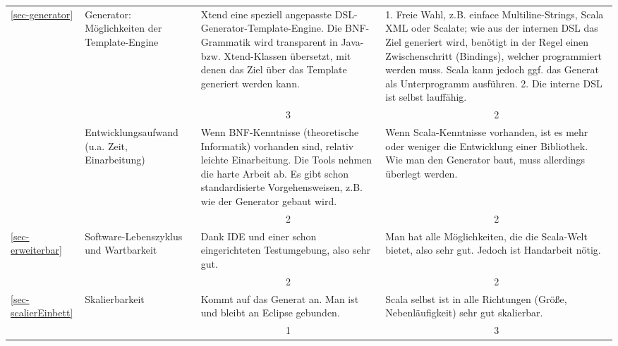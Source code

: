 \begin{landscape}
\begin{longtable}{|p{0.8cm}|p{4.4cm}|p{6.4cm}|p{6.4cm}|}
  \ref{sec-generator}
  & Generator: Möglichkeiten der Template-Engine
  & Xtend eine speziell angepasste DSL-Generator-Template-Engine.
    Die BNF-Grammatik wird transparent in Java- bzw. Xtend-Klassen übersetzt,
    mit denen das Ziel über das Template generiert werden kann.
  & 1. Freie Wahl, z.B. einface Multiline-Strings, Scala XML oder Scalate;
    wie aus der internen DSL das Ziel generiert wird, benötigt in der Regel
    einen Zwischenschritt (Bindings), welcher programmiert werden muss.
    Scala kann jedoch ggf. das Generat als Unterprogramm ausführen.
    2. Die interne DSL ist selbst lauffähig.
  \\
  \cline{3-4}
  & & \multicolumn{1}{c|}{ 3 } & \multicolumn{1}{c|}{ 2 } \\ \hline

  & Entwicklungsaufwand (u.a. Zeit, Einarbeitung)
  & Wenn BNF-Kenntnisse (theoretische Informatik) vorhanden sind,
    relativ leichte Einarbeitung.
    Die Tools nehmen die harte Arbeit ab. Es gibt schon standardisierte
    Vorgehensweisen, z.B. wie der Generator gebaut wird.
  & Wenn Scala-Kenntnisse vorhanden, ist es mehr oder weniger die Entwicklung
    einer Bibliothek.
    Wie man den Generator baut, muss allerdings überlegt werden.
  \\
  \cline{3-4}
  & & \multicolumn{1}{c|}{ 2 } & \multicolumn{1}{c|}{ 2 } \\ \hline

  \ref{sec-erweiterbar}
  & Software-Lebenszyklus und Wartbarkeit
  & Dank IDE und einer schon eingerichteten Testumgebung, also sehr gut.
  & Man hat alle Möglichkeiten, die die Scala-Welt bietet, also sehr gut.
    Jedoch ist Handarbeit nötig.
  \\
  \cline{3-4}
  & & \multicolumn{1}{c|}{ 2 } & \multicolumn{1}{c|}{ 2 } \\ \hline

  \ref{sec-scalierEinbett}
  & Skalierbarkeit
  & Kommt auf das Generat an. Man ist und bleibt an Eclipse gebunden.
  & Scala selbst ist in alle Richtungen (Größe, Nebenläufigkeit) sehr gut
    skalierbar.
  \\
  \cline{3-4}
  & & \multicolumn{1}{c|}{ 1 } & \multicolumn{1}{c|}{ 3 } \\ \hline


\end{longtable}
\end{landscape}
